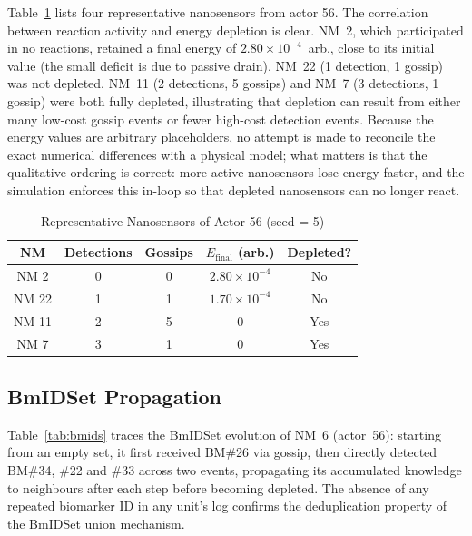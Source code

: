 \documentclass[journal]{IEEEtran}
\begin{document}
Table~\ref{tab:units} lists four representative nanosensors from actor 56.
The correlation between reaction activity and energy depletion is clear.
NM~2, which participated in no reactions, retained a final energy of
$2.80\times10^{-4}$~arb., close to its initial value (the small deficit is
due to passive drain). NM~22 (1 detection, 1 gossip) was not depleted.
NM~11 (2 detections, 5 gossips) and NM~7 (3 detections, 1 gossip) were both
fully depleted, illustrating that depletion can result from either many
low-cost gossip events or fewer high-cost detection events. Because the energy
values are arbitrary placeholders, no attempt is made to reconcile the exact
numerical differences with a physical model; what matters is that the
qualitative ordering is correct: more active nanosensors lose energy faster,
and the simulation enforces this in-loop so that depleted nanosensors can no
longer react.

\begin{table}[!t]
\renewcommand{\arraystretch}{1.3}
\caption{Representative Nanosensors of Actor 56 (seed = 5)}
\label{tab:units}
\centering
\begin{tabular}{ccccc}
\hline
\textbf{NM} & \textbf{Detections} & \textbf{Gossips} & $E_\mathrm{final}$ (arb.) & \textbf{Depleted?} \\
\hline
NM 2  & 0 & 0 & $2.80\times10^{-4}$ & No  \\
NM 22 & 1 & 1 & $1.70\times10^{-4}$ & No  \\
NM 11 & 2 & 5 & $0$ & Yes \\
NM 7  & 3 & 1 & $0$ & Yes \\
\hline
\end{tabular}
\end{table}

\subsection{BmIDSet Propagation}

Table~\ref{tab:bmids} traces the BmIDSet evolution of NM~6 (actor~56):
starting from an empty set, it first received BM\#26 via gossip, then
directly detected BM\#34, \#22 and \#33 across two events, propagating its
accumulated knowledge to neighbours after each step before becoming depleted.
The absence of any repeated biomarker ID in any unit's log confirms the
deduplication property of the BmIDSet union mechanism.
\end{document}
